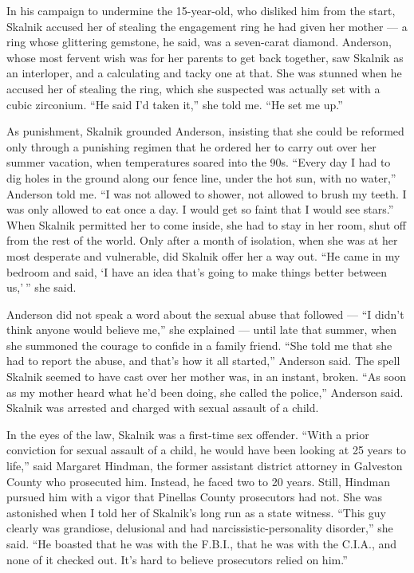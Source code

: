 In his campaign to undermine the 15-year-old, who disliked him from the
start, Skalnik accused her of stealing the engagement ring he had given
her mother --- a ring whose glittering gemstone, he said, was a
seven-carat diamond. Anderson, whose most fervent wish was for her
parents to get back together, saw Skalnik as an interloper, and a
calculating and tacky one at that. She was stunned when he accused her
of stealing the ring, which she suspected was actually set with a cubic
zirconium. ``He said I'd taken it,'' she told me. ``He set me up.''

As punishment, Skalnik grounded Anderson, insisting that she could be
reformed only through a punishing regimen that he ordered her to carry
out over her summer vacation, when temperatures soared into the 90s.
``Every day I had to dig holes in the ground along our fence line, under
the hot sun, with no water,'' Anderson told me. ``I was not allowed to
shower, not allowed to brush my teeth. I was only allowed to eat once a
day. I would get so faint that I would see stars.'' When Skalnik
permitted her to come inside, she had to stay in her room, shut off from
the rest of the world. Only after a month of isolation, when she was at
her most desperate and vulnerable, did Skalnik offer her a way out. ``He
came in my bedroom and said, `I have an idea that's going to make things
better between us,' '' she said.

Anderson did not speak a word about the sexual abuse that followed ---
``I didn't think anyone would believe me,'' she explained --- until late
that summer, when she summoned the courage to confide in a family
friend. ``She told me that she had to report the abuse, and that's how
it all started,'' Anderson said. The spell Skalnik seemed to have cast
over her mother was, in an instant, broken. ``As soon as my mother heard
what he'd been doing, she called the police,'' Anderson said. Skalnik
was arrested and charged with sexual assault of a child.

In the eyes of the law, Skalnik was a first-time sex offender. ``With a
prior conviction for sexual assault of a child, he would have been
looking at 25 years to life,'' said Margaret Hindman, the former
assistant district attorney in Galveston County who prosecuted him.
Instead, he faced two to 20 years. Still, Hindman pursued him with a
vigor that Pinellas County prosecutors had not. She was astonished when
I told her of Skalnik's long run as a state witness. ``This guy clearly
was grandiose, delusional and had narcissistic-personality disorder,''
she said. ``He boasted that he was with the F.B.I., that he was with the
C.I.A., and none of it checked out. It's hard to believe prosecutors
relied on him.''

